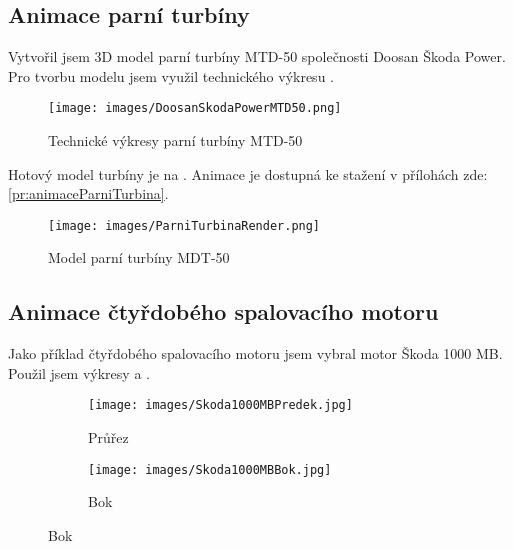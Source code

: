 \subsection{Animace parní turbíny}
{Vytvořil jsem 3D model parní turbíny MTD-50 společnosti Doosan Škoda Power. Pro tvorbu modelu jsem využil technického výkresu .}
\cite{SP:ApplicationAspectsOfSteamTurbinesForCombinedHeatAndPowerGeneration}

\begin{figure}[H]
    \centering
    \texttt{[image: images/DoosanSkodaPowerMTD50.png]}
    \caption{Technické výkresy parní turbíny MTD-50 \cite{SP:ApplicationAspectsOfSteamTurbinesForCombinedHeatAndPowerGeneration}}
    \label{obr:DoosanSkodaPowerMTD50}
\end{figure}

{Hotový model turbíny je na . Animace je dostupná ke stažení v přílohách zde: \ref{pr:animaceParniTurbina}.}

\begin{figure}[H]
    \centering
    \texttt{[image: images/ParniTurbinaRender.png]}
    \caption{Model parní turbíny MDT-50 \jaObr}
    \label{obr:ParniTurbinaRender}
\end{figure}

\newpage

\subsection{Animace čtyřdobého spalovacího motoru}
{Jako příklad čtyřdobého spalovacího motoru jsem vybral motor Škoda 1000 MB. Použil jsem výkresy  a .}
\cite{AUTOMOBIL:Skoda1000MBLegendaSlavi60Let}

\begin{figure}[H]
    \centering
    \begin{subfigure}{.5\textwidth}
        \centering
        \texttt{[image: images/Skoda1000MBPredek.jpg]}
        \caption{Průřez}
        \label{obr:1000MBvykresyPrurez}
    \end{subfigure}%
    \begin{subfigure}{.5\textwidth}
        \centering
        \texttt{[image: images/Skoda1000MBBok.jpg]}
        \caption{Bok}
        \label{obr:1000MBvykresyBok}
    \end{subfigure}
\end{figure}

